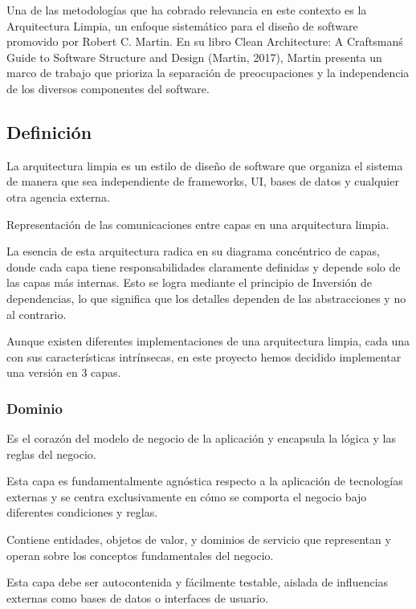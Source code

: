 Una de las metodologías que ha cobrado relevancia en este contexto es la Arquitectura Limpia,
un enfoque sistemático para el diseño de software promovido por
Robert C. Martin.
En su libro Clean Architecture: A Craftsman\'
s Guide to Software Structure and Design (Martin, 2017), Martin presenta un marco de trabajo que prioriza la separación
de preocupaciones y la independencia de los diversos componentes del software.

\subsection{Definición}
La arquitectura limpia es un estilo de diseño de software que
organiza el sistema de manera que sea independiente de frameworks, UI, bases de datos y cualquier otra agencia externa.


Representación de las comunicaciones entre capas en una arquitectura limpia.

La esencia de esta arquitectura radica en su diagrama concéntrico de capas, donde cada capa tiene responsabilidades
claramente definidas y depende solo de las capas más internas.
Esto se logra mediante el principio de Inversión de dependencias, lo que significa que los detalles dependen de las
abstracciones y no al contrario.

Aunque existen diferentes implementaciones de una arquitectura limpia, cada una con sus características intrínsecas, en
este proyecto hemos decidido implementar una versión en 3 capas.

\subsubsection*{Dominio}
Es el corazón del modelo de negocio de la aplicación y encapsula la
lógica y las reglas del negocio.

Esta capa es fundamentalmente agnóstica respecto a la aplicación de tecnologías externas y se
centra exclusivamente en cómo se comporta el negocio bajo diferentes condiciones y reglas.

Contiene entidades, objetos de valor, y dominios de servicio que representan y operan sobre los
conceptos fundamentales del negocio.

Esta capa debe ser autocontenida y fácilmente testable, aislada de influencias externas como bases de
datos o interfaces de usuario.

